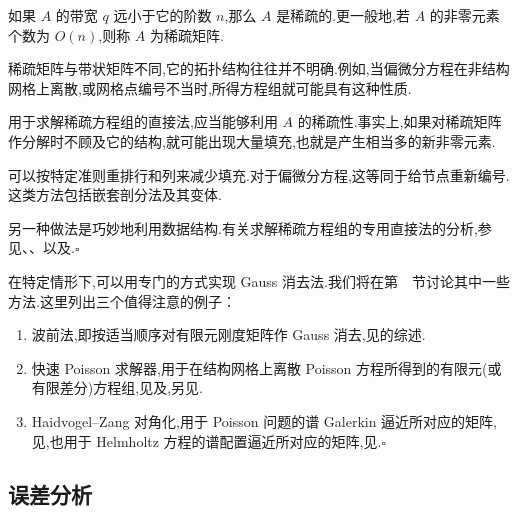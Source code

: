 \begin{note}
如果 \(A\) 的带宽 \(q\) 远小于它的阶数 \(n\),那么 \(A\) 是稀疏的.更一般地,若 \(A\) 的非零元素个数为 \(O(n)\),则称 \(A\) 为稀疏矩阵.

稀疏矩阵与带状矩阵不同,它的拓扑结构往往并不明确.例如,当偏微分方程在非结构网格上离散,或网格点编号不当时,所得方程组就可能具有这种性质.

用于求解稀疏方程组的直接法,应当能够利用 \(A\) 的稀疏性.事实上,如果对稀疏矩阵作分解时不顾及它的结构,就可能出现大量{\heiti 填充},也就是产生相当多的新非零元素.

可以按特定准则重排行和列来减少填充.对于偏微分方程,这等同于给节点重新编号.这类方法包括嵌套剖分法及其变体.

另一种做法是巧妙地利用数据结构.有关求解稀疏方程组的专用直接法的分析,参见、、以及.\hfill\(\square\)
\end{note}

\begin{note}
在特定情形下,可以用专门的方式实现 Gauss 消去法.我们将在第~~节讨论其中一些方法.这里列出三个值得注意的例子：
\begin{enumerate}[label=(\roman*),leftmargin=*]
  \item {\heiti 波前法},即按适当顺序对有限元刚度矩阵作 Gauss 消去,见的综述.
  \item {\heiti 快速 Poisson 求解器},用于在结构网格上离散 Poisson 方程所得到的有限元(或有限差分)方程组,见及,另见.
  \item Haidvogel--Zang 对角化,用于 Poisson 问题的谱 Galerkin 逼近所对应的矩阵,见,也用于 Helmholtz 方程的谱配置逼近所对应的矩阵,见.\hfill\(\square\)
\end{enumerate}
\end{note}

\subsection{误差分析}\label{sec:2.1.2}

